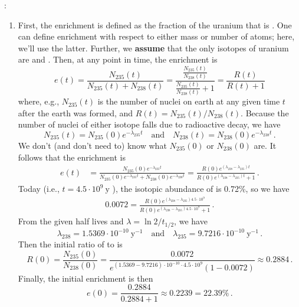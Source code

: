 {
\color{purple}

:
\begin{enumerate}[label=(\alph*)]
\item First, the enrichment is defined as the fraction of the uranium that is .  One can define enrichment with respect to either mass or number of atoms; here, we'll use the latter.  Further, we {\bf assume} that the only isotopes of uranium are  and . Then, at any point in time, the enrichment is
\begin{equation*}
  e(t) = \frac{N_{235}(t)}{N_{235}(t) + N_{238}(t)}
       = \frac{\frac{N_{235}(t)}{N_{238}(t)}} {\frac{N_{235}(t)}{N_{238}(t)}+1}
       = \frac{R(t)} {R(t)+1}
\end{equation*}
where, e.g., $N_{235}(t)$ is the number of  nuclei on earth at any given time $t$ after the earth was formed, and $R(t)=N_{235}(t)/N_{238}(t)$.  Because the number of nuclei of either isotope falls due to radioactive decay, we have
\begin{equation*}
 N_{235}(t) = N_{235}(0) e^{-\lambda_{235} t} \quad \text{and} \quad
 N_{238}(t) = N_{238}(0) e^{-\lambda_{238} t} \, .
\end{equation*}
We don't (and don't need to) know what $N_{235}(0)$ or $N_{238}(0)$ are.  It follows that the enrichment is
\begin{equation*}
\begin{split}
 e(t) &= \frac{N_{235}(0) e^{-\lambda_{235} t}}{N_{235}(0) e^{-\lambda_{235} t}+N_{238}(0) e^{-\lambda_{238} t}}
      = \frac{ R(0) e^{(\lambda_{238}-\lambda_{235}) t}}{R(0) e^{(\lambda_{238}-\lambda_{235}) t}+ 1} \, .
\end{split}
\tag{***}
\end{equation*}
Today (i.e., $t = 4.5\cdot 10^9~\text{y}$ ), the isotopic abundance of  is 0.72\%, so we have
\begin{equation*}
\begin{split}
 0.0072 = \frac{ R(0) e^{(\lambda_{238}-\lambda_{235}) 4.5\cdot 10^9}}
  {R(0) e^{(\lambda_{238}-\lambda_{235}) 4.5\cdot 10^9}+ 1} \, .
\end{split}
\end{equation*}
From the given half lives and $\lambda = \ln{2}/t_{1/2}$, we have
\begin{equation*}
 \lambda_{238} = 1.5369 \cdot 10^{-10}~\text{y}^{-1}
 \quad \text{and} \quad
 \lambda_{235} = 9.7216 \cdot 10^{-10}~\text{y}^{-1} \, .
\end{equation*}
Then the initial ratio of  to  is
\begin{equation*}
 R(0)=\frac{N_{235}(0)}{N_{238}(0)} = \frac{0.0072}{e^{(1.5369-9.7216)\cdot 10^{-10} \cdot 4.5\cdot 10^9}(1-0.0072)} \approx 0.2884 \, .
\end{equation*}
Finally, the initial enrichment is then
\begin{equation*}
  e(0) = \frac{0.2884}{0.2884+1} \approx \boxed{0.2239 = 22.39\%} \, .
\end{equation*}




\end{enumerate}}
